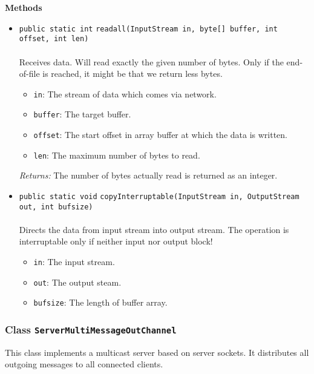 \textbf{\sffamily Methods}
\begin{itemize}
\item \lstinline|public static int| \lstinline|readall|\lstinline|(InputStream in, byte[] buffer, int offset, int len)|\\ \\[-0.6em]
Receives data. Will read exactly the given number of bytes. Only if the
 end-of-file is reached, it might be that we return less bytes.
\begin{itemize}
\item \lstinline|in|: The stream of data which comes via network.
\item \lstinline|buffer|: The target buffer.
\item \lstinline|offset|: The start offset in array buffer at which the data is written.
\item \lstinline|len|: The maximum number of bytes to read.
\end{itemize}

\emph{Returns:} The number of bytes actually read is returned as an integer.

\item \lstinline|public static void| \lstinline|copyInterruptable|\lstinline|(InputStream in, OutputStream out, int bufsize)|\\ \\[-0.6em]
Directs the data from input stream into output stream.
 The operation is interruptable only if neither input nor output block!
\begin{itemize}
\item \lstinline|in|: The input stream.
\item \lstinline|out|: The output steam.
\item \lstinline|bufsize|: The length of buffer array.
\end{itemize}



\end{itemize}

\subsubsection{Class \lstinline|ServerMultiMessageOutChannel|}
This class implements a multicast server based on server sockets. It distributes all outgoing
 messages to all connected clients. \\
\noindent\begin{minipage}[t]{5cm}
\vspace{0.3em}
\hspace*{2em}
\vspace{0.3em}
\end{minipage}



